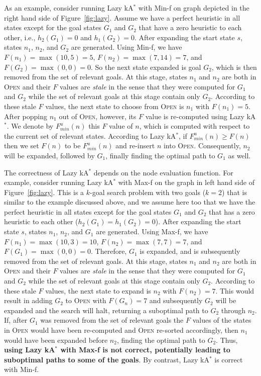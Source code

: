 \documentclass{aicom2e}
\newcommand{\kgs}{$k$-goal search}
\newcommand{\kastar}{kA$^*$}
\newcommand{\minf}{Min-f}
\newcommand{\maxf}{Max-f}
\newcommand{\open}{\textsc{Open}}
\begin{document}
As an example, consider running Lazy \kastar{} with \minf{} on graph depicted in the right hand side of Figure~\ref{fig:lazy}. Assume we have a perfect heuristic in all states except for the goal states $G_1$ and $G_2$ that have a zero heuristic to each other, i.e., $h_2(G_1)=0$ and $h_1(G_2)=0$. After expanding the start state $s$, states $n_1$, $n_2$, and $G_2$ are generated. Using \minf{}, we have $F(n_1)=\max(10,5)=5$, $F(n_2)=\max(7,14)=7$, and $F(G_2)=\max(0,0)=0$. So the next state expanded is goal $G_2$, which is then removed from the set of relevant goals. At this stage, states $n_1$ and $n_2$ are both in \open{} and their $F$ values are {\em stale} in the sense that they were computed for $G_1$ and $G_2$ while the set of relevant goals at this stage contain only $G_2$. According to these stale $F$ values, the next state to choose from \open{} is $n_1$ with $F(n_1)=5$. After popping $n_1$ out of \open{}, however, its $F$ value is re-computed  using Lazy \kastar{}. We denote by $F^u_{min}(n)$ this $F$ value of $n$, which is computed with respect to the current set of relevant states. According to Lazy \kastar{}, if $F^u_{min}(n)\geq F(n)$ then we set $F(n)$ to be $F^u_{min}(n)$ and re-insert $n$ into \open{}. Consequently, $n_2$ will be expanded, followed by $G_1$, finally finding the optimal path to $G_1$ as well. 


The correctness of Lazy \kastar{} depends on the node evaluation function. For example, consider running Lazy \kastar{} with \maxf{} on the graph in left hand side of Figure~\ref{fig:lazy}. This is a \kgs{} problem with two goals ($k=2$) that is similar to the example discussed above, and we assume here too that we have the perfect heuristic in all states except for the goal states $G_1$ and $G_2$ that has a zero heuristic to each other ($h_2(G_1)=h_1(G_2)=0$). After expanding the start state $s$, states $n_1$, $n_2$, and $G_1$ are generated. Using \maxf{}, we have $F(n_1)=\max(10,3)=10$, $F(n_2)=\max(7,7)=7$, and $F(G_1)=\max(0,0)=0$. Therefore, $G_1$ is expanded, and is subsequently removed from the set of relevant goals. At this stage, states $n_1$ and $n_2$ are both in \open{} and their $F$ values are {\em stale} in the sense that they were computed for $G_1$ and $G_2$ while the set of relevant goals at this stage contain only $G_2$. According to these stale $F$ values, the next state to expand is $n_2$ with $F(n_2)=7$. This would result in adding $G_2$ to \open{} with $F(G_n)=7$ and subsequently $G_2$ will be expanded and the search will halt, returning a suboptimal path to $G_2$ through $n_2$. If, after $G_1$ was removed from the set of relevant goals the $F$ values of the states in \open{} would have been re-computed and \open{} re-sorted accordingly, then $n_1$ would have been expanded before $n_2$, finding the optimal path to $G_2$. Thus, {\bf using Lazy \kastar{} with \maxf{} is not correct, potentially leading to suboptimal paths to some of the goals}. By contrast, Lazy \kastar{} is correct with \minf{}. 
\end{document}
